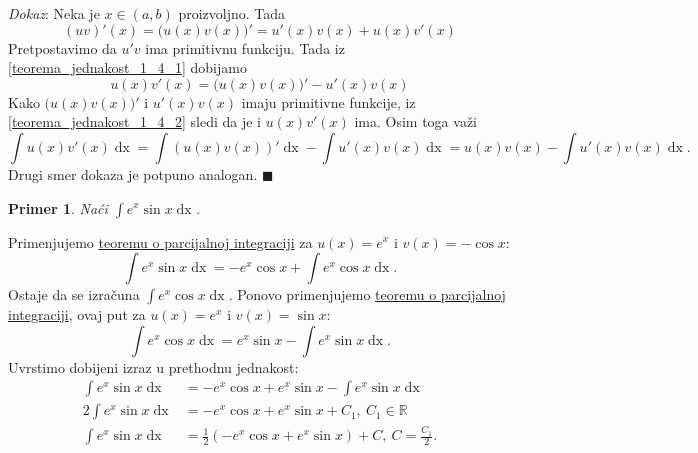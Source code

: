 \documentclass{article}
\newtheorem{prim}{Primer}[section]
\DeclareMathOperator{\dx}{dx}
\begin{document}
\textit{Dokaz}: Neka je $x \in \left(a, b\right)$ proizvoljno. Tada
\begin{equation}\label{teorema_jednakost_1_4_1}
    \left(uv\right)'\left(x\right) = \bigl(u\left(x\right) v\left(x\right)\bigr)' = u'\left(x\right)v\left(x\right) + u\left(x\right)v'\left(x\right)
\end{equation}
Pretpostavimo da $u'v$ ima primitivnu funkciju. Tada iz \eqref{teorema_jednakost_1_4_1} dobijamo
\begin{equation}\label{teorema_jednakost_1_4_2}
    u\left(x\right)v'\left(x\right) = \bigl(u\left(x\right) v\left(x\right)\bigr)' - u'\left(x\right)v\left(x\right)
\end{equation}
Kako $\bigl(u\left(x\right)v\left(x\right)\bigr)'$ i $u'\left(x\right)v\left(x\right)$ imaju primitivne funkcije,
iz \eqref{teorema_jednakost_1_4_2} sledi da je i $u\left(x\right)v'\left(x\right)$ ima. Osim toga važi
$$\int u\left(x\right)v'\left(x\right)\dx = \int\left(u\left(x\right)v\left(x\right)\right)'\dx - \int u'\left(x\right)v\left(x\right)\dx = u\left(x\right)v\left(x\right) -\int u'\left(x\right)v\left(x\right)\dx.$$
Drugi smer dokaza je potpuno analogan.
\null\hfill $\blacksquare$\par

\begin{primbox}
    \label{primer_1.13}
    \begin{prim}
        Naći $\displaystyle\int e^x \sin x \dx$.
    \end{prim}
    Primenjujemo \hyperref[teorema_1.4]{teoremu o parcijalnoj integraciji} za $u\left(x\right) = e^x$ i $v\left(x\right) = -\cos x$:
    $$\displaystyle\int e^x\sin x \dx = -e^x\cos x + \int e^x \cos x\dx.$$
    Ostaje da se izračuna $\displaystyle\int e^x\cos x \dx$. Ponovo primenjujemo
    \hyperref[teorema_1.4]{teoremu o parcijalnoj integraciji}, ovaj
    put za $u\left(x\right) = e^x$ i $ v\left(x\right) = \sin x$:
    $$\displaystyle\int e^x\cos x \dx = e^x\sin x - \int e^x\sin x \dx.$$
    Uvrstimo dobijeni izraz u prethodnu jednakost:
    \begin{align*}
        \int e^x \sin x \dx  & = -e^x\cos x + e^x \sin x - \int e^x \sin x \dx                        \\
        2\int e^x \sin x \dx & = -e^x\cos x + e^x \sin x +C_1,\ C_1\in\mathbb{R}                      \\
        \int e^x \sin x \dx  & = \frac{1}{2}\left(-e^x\cos x + e^x \sin x\right)+C,\ C=\frac{C_1}{2}.
    \end{align*}
\end{primbox}
\end{document}
